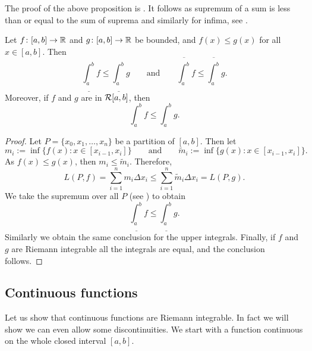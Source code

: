 The proof of the above proposition is .
It follows as supremum of a sum is less than or equal to the sum of
suprema and similarly for infima, see .

\begin{prop}[Monotonicity]
Let $f \colon [a,b] \to {\mathbb{R}}$ and $g \colon [a,b] \to {\mathbb{R}}$ be
bounded, and $f(x) \leq g(x)$
for all $x \in [a,b]$.  Then
\begin{equation*}
\underline{\int_a^b} f 
\leq
\underline{\int_a^b} g 
\qquad \text{and} \qquad
\overline{\int_a^b} f 
\leq
\overline{\int_a^b} g .
\end{equation*}
Moreover, if $f$ and $g$ are in ${\mathcal{R}}[a,b]$, then
\begin{equation*}
\int_a^b f 
\leq
\int_a^b g .
\end{equation*}
\end{prop}

\begin{proof}
Let $P = \{ x_0, x_1, \ldots, x_n \}$ be a partition of $[a,b]$.  Then
let
\begin{equation*}
m_i := \inf \{ f(x) : x \in [x_{i-1},x_i] \}
\qquad \text{and} \qquad
\widetilde{m}_i := \inf \{ g(x) : x \in [x_{i-1},x_i] \} .
\end{equation*}
As $f(x) \leq g(x)$, then $m_i \leq \widetilde{m}_i$.
Therefore,
\begin{equation*}
L(P,f)
=
\sum_{i=1}^n m_i \Delta x_i
\leq
\sum_{i=1}^n \widetilde{m}_i \Delta x_i
=
L(P,g) .
\end{equation*}
We take the supremum over all $P$ (see ) to obtain 
\begin{equation*}
\underline{\int_a^b} f 
\leq
\underline{\int_a^b} g .
\end{equation*}
Similarly we obtain the same conclusion for the upper integrals.
Finally,
if $f$ and $g$ are Riemann integrable all the integrals are equal,
and the conclusion follows.
\end{proof}

\subsection{Continuous functions}

Let us show that continuous functions are Riemann integrable.  In fact we
will show we can even allow some discontinuities.  We start with a
function continuous on the whole closed interval $[a,b]$.

